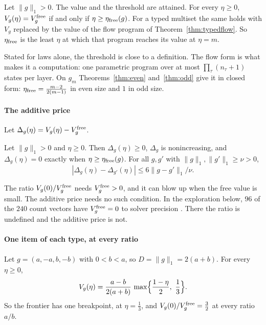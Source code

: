 \begin{theorem}
\label{thm:freeband}
Let $\|g\|_1>0$. The value and the threshold are attained. For every $\eta\ge0$,
$V_g(\eta)=V^{\rm free}_g$ if and only if $\eta\ge\eta_{\rm free}(g)$. For a typed multiset
the same holds with $V_g$ replaced by the value of the flow program of
Theorem~\ref{thm:typedflow}. So $\eta_{\rm free}$ is the least $\eta$ at which that program
reaches its value at $\eta=m$.
\end{theorem}

Stated for laws alone, the threshold is close to a definition. The flow form is what makes it a
computation: one parametric program over at most $\prod_\tau(n_\tau+1)$ states per layer. On
$g_m$ Theorems~\ref{thm:even} and~\ref{thm:odd} give it in closed form:
$\eta_{\rm free}=\frac{m-2}{2(m-1)}$ in even size and $1$ in odd size.

\paragraph{The additive price} Let $\Delta_g(\eta)=V_g(\eta)-V^{\rm free}_g$.

\begin{proposition}
\label{prop:gap}
Let $\|g\|_1>0$ and $\eta\ge0$. Then $\Delta_g(\eta)\ge0$, $\Delta_g$ is nonincreasing, and
$\Delta_g(\eta)=0$ exactly when $\eta\ge\eta_{\rm free}(g)$. For all $g,g'$ with
$\|g\|_1,\|g'\|_1\ge\nu>0$,
\[
|\Delta_g(\eta)-\Delta_{g'}(\eta)|\le6\|g-g'\|_1/\nu.
\]
\end{proposition}

The ratio $V_g(0)/V^{\rm free}_g$ needs $V^{\rm free}_g>0$, and it can blow up when the free
value is small. The additive price needs no such condition. In the exploration below, $96$ of the
$240$ count vectors have $V^{\rm free}_g=0$ to solver precision \NUM. There the ratio is undefined and the
additive price is not.

\paragraph{One item of each type, at every ratio}
\begin{theorem}
\label{thm:twomag}
Let $g=(a,-a,b,-b)$ with $0<b<a$, so $D=\|g\|_1=2(a+b)$. For every $\eta\ge0$,
\[
V_g(\eta)=\frac{a-b}{2(a+b)}\,\max\Bigl\{\frac{1-\eta}2,\ \frac13\Bigr\}.
\]
So the frontier has one breakpoint, at $\eta=\frac13$, and $V_g(0)/V_g^{\rm free}=\frac32$ at
every ratio $a/b$.
\end{theorem}

